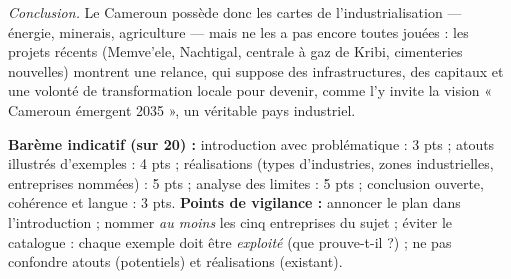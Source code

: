 \documentclass[11pt]{article}
\begin{document}
\begin{corrige}
\emph{Conclusion.} Le Cameroun possède donc les cartes de l'industrialisation — énergie, minerais, agriculture — mais ne les a pas encore toutes jouées : les projets récents (Memve'ele, Nachtigal, centrale à gaz de Kribi, cimenteries nouvelles) montrent une relance, qui suppose des infrastructures, des capitaux et une volonté de transformation locale pour devenir, comme l'y invite la vision « Cameroun émergent 2035 », un véritable pays industriel.

\textbf{Barème indicatif (sur 20) :} introduction avec problématique : 3 pts ; atouts illustrés d'exemples : 4 pts ; réalisations (types d'industries, zones industrielles, entreprises nommées) : 5 pts ; analyse des limites : 5 pts ; conclusion ouverte, cohérence et langue : 3 pts.
\textbf{Points de vigilance :} annoncer le plan dans l'introduction ; nommer \emph{au moins} les cinq entreprises du sujet ; éviter le catalogue : chaque exemple doit être \emph{exploité} (que prouve-t-il ?) ; ne pas confondre atouts (potentiels) et réalisations (existant).
\end{corrige}
\end{document}
